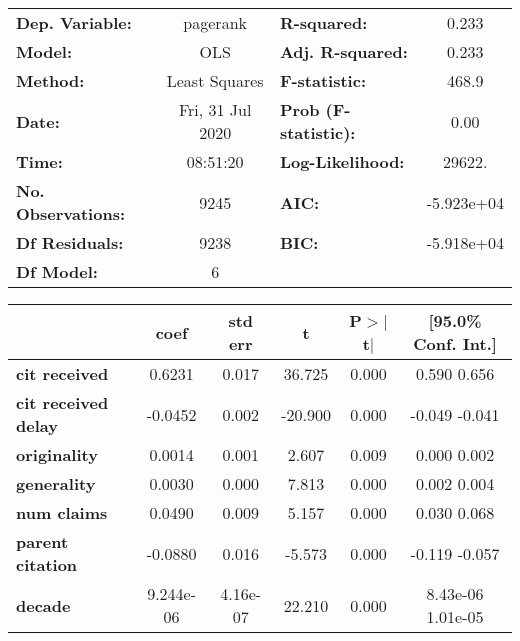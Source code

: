 \begin{center}
\begin{tabular}{lclc}
\toprule
\textbf{Dep. Variable:}     &     pagerank     & \textbf{  R-squared:         } &      0.233    \\
\textbf{Model:}             &       OLS        & \textbf{  Adj. R-squared:    } &      0.233    \\
\textbf{Method:}            &  Least Squares   & \textbf{  F-statistic:       } &      468.9    \\
\textbf{Date:}              & Fri, 31 Jul 2020 & \textbf{  Prob (F-statistic):} &      0.00     \\
\textbf{Time:}              &     08:51:20     & \textbf{  Log-Likelihood:    } &     29622.    \\
\textbf{No. Observations:}  &        9245      & \textbf{  AIC:               } &  -5.923e+04   \\
\textbf{Df Residuals:}      &        9238      & \textbf{  BIC:               } &  -5.918e+04   \\
\textbf{Df Model:}          &           6      & \textbf{                     } &               \\
\bottomrule
\end{tabular}
\begin{tabular}{lccccc}
                            & \textbf{coef} & \textbf{std err} & \textbf{t} & \textbf{P$>$$|$t$|$} & \textbf{[95.0\% Conf. Int.]}  \\
\midrule
\textbf{cit received}       &       0.6231  &        0.017     &    36.725  &         0.000        &         0.590     0.656       \\
\textbf{cit received delay} &      -0.0452  &        0.002     &   -20.900  &         0.000        &        -0.049    -0.041       \\
\textbf{originality}        &       0.0014  &        0.001     &     2.607  &         0.009        &         0.000     0.002       \\
\textbf{generality}         &       0.0030  &        0.000     &     7.813  &         0.000        &         0.002     0.004       \\
\textbf{num claims}         &       0.0490  &        0.009     &     5.157  &         0.000        &         0.030     0.068       \\
\textbf{parent citation}    &      -0.0880  &        0.016     &    -5.573  &         0.000        &        -0.119    -0.057       \\
\textbf{decade}             &    9.244e-06  &     4.16e-07     &    22.210  &         0.000        &      8.43e-06  1.01e-05       \\

\end{tabular}
\end{center}

